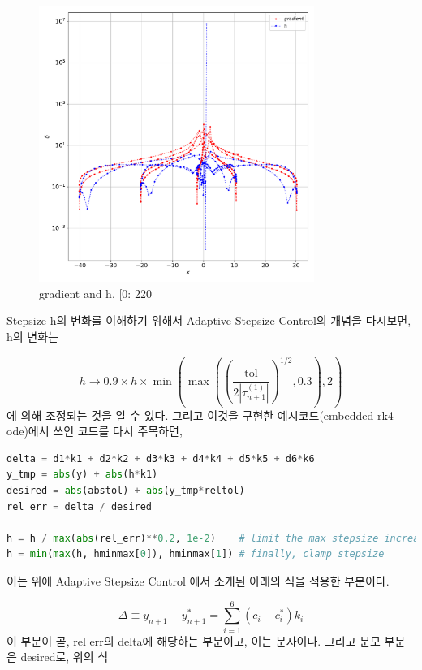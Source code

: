 \documentclass[11pt]{article}
\begin{document}
\begin{figure}[!ht]
  \centering
  \includegraphics[width=0.8\textwidth]{xandhs5.pdf}
  \caption{gradient and h, [0: 220}
\end{figure} 
Stepsize h의 변화를 이해하기 위해서 Adaptive Stepsize Control의 개념을 다시보면, h의 변화는 

\begin{equation}
h \rightarrow 0.9\times h\times \min \left(\max \left(\left({\frac{\text{tol}}{2\left|\tau_{n+1}^{(1)}\right|}}\right)^{1/2},0.3\right),2\right)
\end{equation}
에 의해 조정되는 것을 알 수 있다. 그리고 이것을 구현한 예시코드(embedded rk4 ode)에서 쓰인 코드를 다시 주목하면,

\begin{lstlisting}[language=Python]
delta = d1*k1 + d2*k2 + d3*k3 + d4*k4 + d5*k5 + d6*k6
y_tmp = abs(y) + abs(h*k1) 
desired = abs(abstol) + abs(y_tmp*reltol)
rel_err = delta / desired
        
h = h / max(abs(rel_err)**0.2, 1e-2)    # limit the max stepsize increase
h = min(max(h, hminmax[0]), hminmax[1]) # finally, clamp stepsize
\end{lstlisting}
이는 위에 Adaptive Stepsize Control 에서 소개된 아래의 식을 적용한 부분이다.

\begin{equation}
\Delta \equiv y_{n + 1} - y_{n + 1}^* = \sum_{i = 1}^{6} \left(c_i - c_i^*\right) k_i
\end{equation}
이 부분이 곧, rel err의 delta에 해당하는 부분이고, 이는 분자이다. 그리고 분모 부분은 desired로, 위의 식
\end{document}
